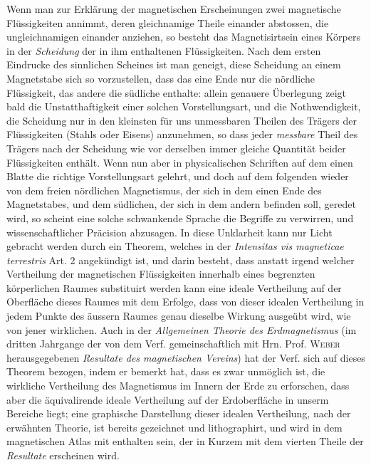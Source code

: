 Wenn man zur Erklärung der magnetischen Erscheinungen zwei magnetische
Flüssigkeiten annimmt, deren gleichnamige Theile einander abstossen, die
ungleichnamigen einander anziehen, so besteht das Magnetisirtsein eines Körpers
in der \textit{Scheidung} der in ihm enthaltenen Flüssigkeiten. Nach dem ersten Eindrucke
des sinnlichen Scheines ist man geneigt, diese Scheidung an einem Magnetstabe
sich so vorzustellen, dass das eine Ende nur die nördliche Flüssigkeit, das andere
die südliche enthalte: allein genauere Überlegung zeigt bald die Unstatthaftigkeit
einer solchen Vorstellungsart, und die Nothwendigkeit, die Scheidung nur in den
kleinsten für uns unmessbaren Theilen des Trägers der Flüssigkeiten (Stahls oder
Eisens) anzunehmen, so dass jeder \textit{messbare} Theil des Trägers nach der Scheidung
wie vor derselben immer gleiche Quantität beider Flüssigkeiten enthält. Wenn
nun aber in physicalischen Schriften auf dem einen
\clearpage
{}
\noindent
Blatte die richtige Vorstellungsart gelehrt, und doch auf dem folgenden wieder
von dem freien nördlichen Magnetismus, der sich in dem einen Ende des Magnetstabes,
und dem südlichen, der sich in dem andern befinden soll, geredet wird,
so scheint eine solche schwankende Sprache die Begriffe zu verwirren, und
wissenschaftlicher Präcision abzusagen. In diese Unklarheit kann nur Licht
gebracht werden durch ein Theorem, welches in der \textit{Intensitas vis magneticae
terrestris} Art. 2 angekündigt ist, und darin besteht, dass anstatt irgend welcher
Vertheilung der magnetischen Flüssigkeiten innerhalb eines begrenzten körperlichen
Raumes substituirt werden kann eine ideale Vertheilung auf der Oberfläche
dieses Raumes mit dem Erfolge, dass von dieser idealen Vertheilung in jedem
Punkte des äussern Raumes genau dieselbe Wirkung ausgeübt wird, wie von jener
wirklichen. Auch in der \textit{Allgemeinen Theorie des Erdmagnetismus} (im dritten
Jahrgange der von dem Verf. gemeinschaftlich mit Hrn. Prof. \textsc{Weber} herausgegebenen
\textit{Resultate des magnetischen Vereins}) hat der Verf. sich auf dieses
Theorem bezogen, indem er bemerkt hat, dass es zwar unmöglich ist, die wirkliche
Vertheilung des Magnetismus im Innern der Erde zu erforschen, dass aber
die äquivalirende ideale Vertheilung auf der Erdoberfläche in unserm Bereiche
liegt; eine graphische Darstellung dieser idealen Vertheilung, nach der erwähnten
Theorie, ist bereits gezeichnet und lithographirt, und wird in dem magnetischen
Atlas mit enthalten sein, der in Kurzem mit dem vierten Theile der \textit{Resultate}
erscheinen wird.

